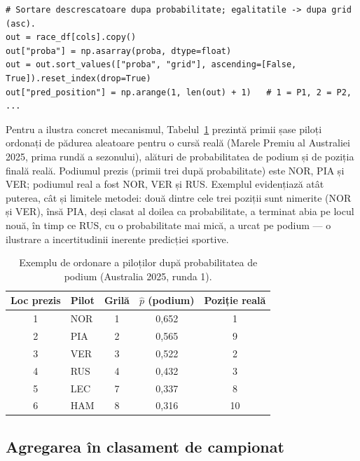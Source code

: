 \documentclass[12pt,a4paper]{report}
\begin{document}
\begin{lstlisting}[caption={Ordonarea pilotilor unei curse dupa probabilitatea de podium.}, label={lst:rank}]
# Sortare descrescatoare dupa probabilitate; egalitatile -> dupa grid (asc).
out = race_df[cols].copy()
out["proba"] = np.asarray(proba, dtype=float)
out = out.sort_values(["proba", "grid"], ascending=[False, True]).reset_index(drop=True)
out["pred_position"] = np.arange(1, len(out) + 1)   # 1 = P1, 2 = P2, ...
\end{lstlisting}

Pentru a ilustra concret mecanismul, Tabelul~\ref{tab:exemplu_ordonare} prezintă primii șase
piloți ordonați de pădurea aleatoare pentru o cursă reală (Marele Premiu al Australiei 2025,
prima rundă a sezonului), alături de probabilitatea de podium și de poziția finală reală. Podiumul
prezis (primii trei după probabilitate) este NOR, PIA și VER; podiumul real a fost NOR, VER și RUS.
Exemplul evidențiază atât puterea, cât și limitele metodei: două dintre cele trei poziții sunt
nimerite (NOR și VER), însă PIA, deși clasat al doilea ca probabilitate, a terminat abia pe locul
nouă, în timp ce RUS, cu o probabilitate mai mică, a urcat pe podium --- o ilustrare a
incertitudinii inerente predicției sportive.

\begin{table}[htbp]
  \centering
  \begin{tabular}{c l c c c}
    \toprule
    \textbf{Loc prezis} & \textbf{Pilot} & \textbf{Grilă} & \textbf{$\hat{p}$ (podium)} & \textbf{Poziție reală} \\
    \midrule
    1 & NOR & 1 & 0,652 & 1 \\
    2 & PIA & 2 & 0,565 & 9 \\
    3 & VER & 3 & 0,522 & 2 \\
    4 & RUS & 4 & 0,432 & 3 \\
    5 & LEC & 7 & 0,337 & 8 \\
    6 & HAM & 8 & 0,316 & 10 \\
    \bottomrule
  \end{tabular}
  \caption{Exemplu de ordonare a piloților după probabilitatea de podium (Australia 2025, runda 1).}
  \label{tab:exemplu_ordonare}
\end{table}

\subsection{Agregarea în clasament de campionat}
\end{document}
